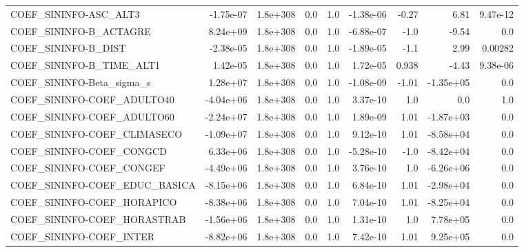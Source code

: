 \begin{tabular}{lrrrrrrrr}
COEF\_SININFO-ASC\_ALT3             &   -1.75e-07 &     1.8e+308 &     0.0 &      1.0 &  -1.38e-06 &       -0.27 &         6.81 &      9.47e-12 \\
COEF\_SININFO-B\_ACTAGRE            &    8.24e+09 &     1.8e+308 &     0.0 &      1.0 &  -6.88e-07 &        -1.0 &        -9.54 &           0.0 \\
COEF\_SININFO-B\_DIST               &   -2.38e-05 &     1.8e+308 &     0.0 &      1.0 &  -1.89e-05 &        -1.1 &         2.99 &       0.00282 \\
COEF\_SININFO-B\_TIME\_ALT1          &    1.42e-05 &     1.8e+308 &     0.0 &      1.0 &   1.72e-05 &       0.938 &        -4.43 &      9.38e-06 \\
COEF\_SININFO-Beta\_sigma\_s         &    1.28e+07 &     1.8e+308 &     0.0 &      1.0 &  -1.08e-09 &       -1.01 &    -1.35e+05 &           0.0 \\
COEF\_SININFO-COEF\_ADULTO40        &   -4.04e+06 &     1.8e+308 &     0.0 &      1.0 &   3.37e-10 &         1.0 &          0.0 &           1.0 \\
COEF\_SININFO-COEF\_ADULTO60        &   -2.24e+07 &     1.8e+308 &     0.0 &      1.0 &   1.89e-09 &        1.01 &    -1.87e+03 &           0.0 \\
COEF\_SININFO-COEF\_CLIMASECO       &   -1.09e+07 &     1.8e+308 &     0.0 &      1.0 &   9.12e-10 &        1.01 &    -8.58e+04 &           0.0 \\
COEF\_SININFO-COEF\_CONGCD          &    6.33e+06 &     1.8e+308 &     0.0 &      1.0 &  -5.28e-10 &        -1.0 &    -8.42e+04 &           0.0 \\
COEF\_SININFO-COEF\_CONGEF          &   -4.49e+06 &     1.8e+308 &     0.0 &      1.0 &   3.76e-10 &         1.0 &    -6.26e+06 &           0.0 \\
COEF\_SININFO-COEF\_EDUC\_BASICA     &   -8.15e+06 &     1.8e+308 &     0.0 &      1.0 &   6.84e-10 &        1.01 &    -2.98e+04 &           0.0 \\
COEF\_SININFO-COEF\_HORAPICO        &   -8.38e+06 &     1.8e+308 &     0.0 &      1.0 &   7.04e-10 &        1.01 &    -8.25e+04 &           0.0 \\
COEF\_SININFO-COEF\_HORASTRAB       &   -1.56e+06 &     1.8e+308 &     0.0 &      1.0 &   1.31e-10 &         1.0 &     7.78e+05 &           0.0 \\
COEF\_SININFO-COEF\_INTER           &   -8.82e+06 &     1.8e+308 &     0.0 &      1.0 &   7.42e-10 &        1.01 &     9.25e+05 &           0.0 \\

\end{tabular}

